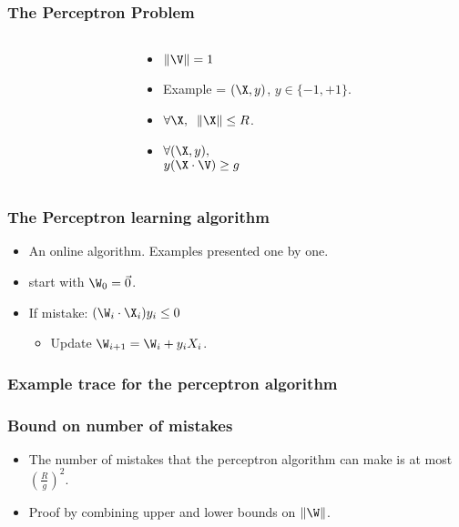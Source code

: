 \documentclass{beamer}
\begin{document}
\begin{frame}
\frametitle{The Perceptron Problem}
\begin{columns}
\begin{column}[T]{5.2cm}
\end{column}

\begin{column}[T]{4cm}
\begin{itemize}
\item
$\| \V \| =1$
\item 
Example = $(\X,y)$, $y \in \{-1,+1\}$.
\item
$\forall \X,\;\; \| \X \| \leq R$.
\item
$\forall (\X,y),$\\$y(\X \cdot \V) \geq g$
\end{itemize}
\end{column}
\end{columns}

\end{frame}

\begin{frame}
\frametitle{The Perceptron learning algorithm}
\begin{itemize}
\item An online algorithm. Examples presented one by one.
\item start with $\W_0 = \vec{0}$.
\item If mistake: $(\W_i \cdot \X_i) y_i \leq  0$
\begin{itemize}
\item Update $\W_{i+1} = \W_i + y_i X_i$.
\end{itemize}
\end{itemize}
\end{frame}

\begin{frame}
\frametitle{Example trace for the perceptron algorithm}
\end{frame}

\begin{frame}
\frametitle{Bound on number of mistakes}
\begin{itemize}
\item The number of mistakes that the perceptron algorithm can make is at most
$\left(\frac{R}{g}\right)^2$.
\item Proof by combining upper and lower bounds on $\| \W \|$.
\end{itemize}
\end{frame}
\end{document}
